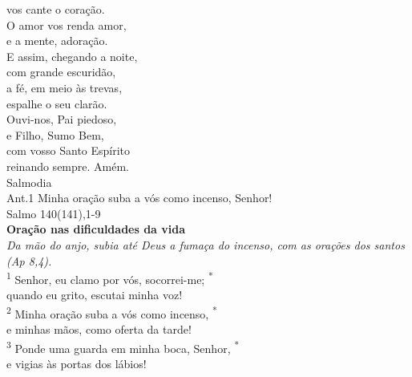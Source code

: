 \documentclass{book}
\begin{document}
\begin{center}
    vos cante o coração. \\
    O amor vos renda amor, \\
    e a mente, adoração.
    \vspace{.2cm} \\
    E assim, chegando a noite, \\
    com grande escuridão, \\
    a fé, em meio às trevas, \\
    espalhe o seu clarão.
    \vspace{.2cm} \\
    Ouvi-nos, Pai piedoso, \\
    e Filho, Sumo Bem, \\
    com vosso Santo Espírito \\
    reinando sempre. Amém.
    \vspace{.2cm} \\
    \textcolor{VioletRed1}{Salmodia}
    \vspace{.2cm} \\
    \textcolor{VioletRed1}{Ant.1} Minha oração suba a vós como incenso, Senhor!
    \vspace{.2cm} \\
    \textcolor{VioletRed1}{Salmo 140(141),1-9}
    \vspace{.2cm} \\
    \textbf{Oração nas dificuldades da vida} \\
    \textit{Da mão do anjo, subia até Deus a fumaça do incenso, com as orações dos santos (Ap 8,4).}
    \vspace{.2cm} \\
    \textsuperscript{\underline{\hspace{.07in}}\textcolor{VioletRed1}{1}} Senhor, eu clamo por vós, socorrei-me; \textsuperscript{*} \\
    quando eu grito, escutai minha voz! \\
    \textsuperscript{\underline{\hspace{.07in}}\textcolor{VioletRed1}{2}} Minha oração suba a vós como incenso, \textsuperscript{*} \\
    e minhas mãos, como oferta da tarde!
    \vspace{.2cm} \\
    \textsuperscript{\underline{\hspace{.07in}}\textcolor{VioletRed1}{3}} Ponde uma guarda em minha boca, Senhor, \textsuperscript{*} \\
    e vigias às portas dos lábios! \textsuperscript{\underline{\hspace{.07in}}}

\end{center}
\end{document}
